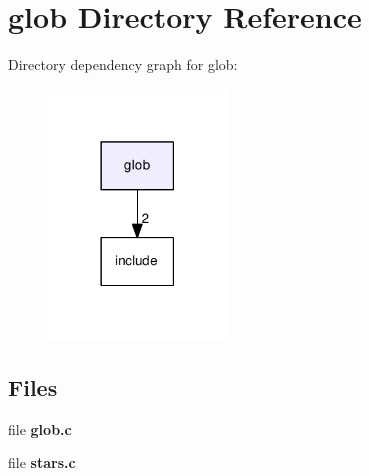 \section{glob Directory Reference}
\label{dir_9aa948441d3b15a37b6db58289d760b7}
Directory dependency graph for glob\-:\nopagebreak
\begin{figure}[H]
\begin{center}
\leavevmode
\includegraphics[width=134pt]{dir_9aa948441d3b15a37b6db58289d760b7_dep}
\end{center}
\end{figure}
\subsection*{Files}
\begin{DoxyCompactItemize}
\item 
file {\bf glob.\-c}
\item 
file {\bf stars.\-c}
\end{DoxyCompactItemize}
